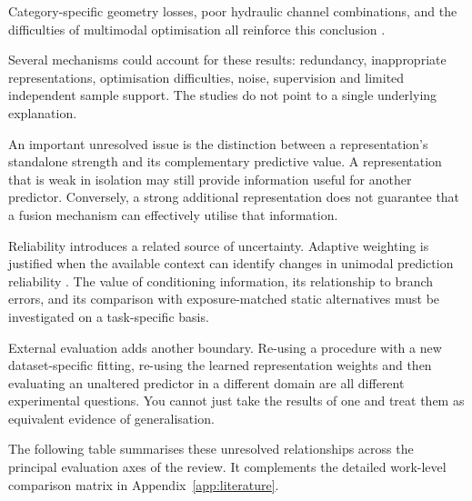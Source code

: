 Category-specific geometry losses, poor hydraulic channel combinations, and the difficulties of
multimodal optimisation all reinforce this conclusion
\parencite{Horwitz2023Back,Bonfiglioli2023The,Goodarzi2023Deep,Wang2020What}.

Several mechanisms could account for these results: redundancy, inappropriate representations,
optimisation difficulties, noise, supervision and limited independent sample support. The studies do
not point to a single underlying explanation.

An important unresolved issue is the distinction between a representation's standalone strength and
its complementary predictive value. A representation that is weak in isolation may still provide
information useful for another predictor. Conversely, a strong additional representation does not
guarantee that a fusion mechanism can effectively utilise that information.

Reliability introduces a related source of uncertainty. Adaptive weighting is justified when the
available context can identify changes in unimodal prediction reliability \parencite{Zhang2023QMF,P022}.
The value of conditioning information, its relationship to branch errors, and its comparison with
exposure-matched static alternatives must be investigated on a task-specific basis.

External evaluation adds another boundary. Re-using a procedure with a new dataset-specific fitting,
re-using the learned representation weights and then evaluating an unaltered predictor in a
different domain are all different experimental questions. You cannot just take the results of one
and treat them as equivalent evidence of generalisation.

The following table summarises these unresolved relationships across the principal evaluation axes
of the review. It complements the detailed work-level comparison matrix in
Appendix~\ref{app:literature}.


